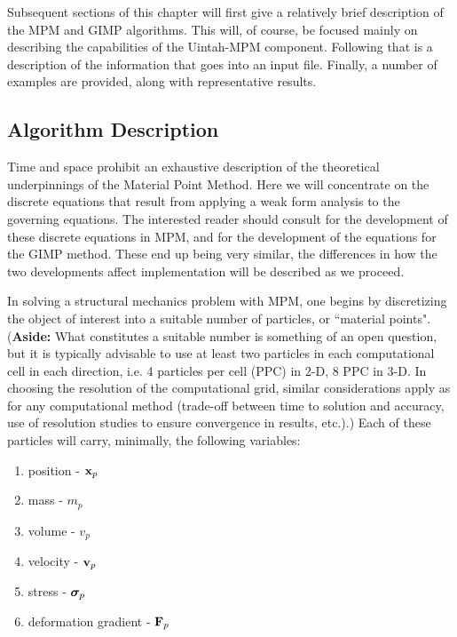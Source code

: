 Subsequent sections of this chapter will first give a relatively brief
description of the MPM and GIMP algorithms.  This will, of course, be
focused mainly on describing the capabilities of the Uintah-MPM component.
Following that is a description of the information that goes into an input
file.  Finally, a number of examples are provided, along with representative
results.

\subsection{Algorithm Description}

Time and space prohibit an exhaustive description of the theoretical
underpinnings of the Material Point Method.   Here we will concentrate
on the discrete equations that result from applying a weak form analysis
to the governing equations.  The interested reader should
consult \cite{sulskycmame,sulskycpc} for the development of these discrete
equations in MPM, and \cite{bardgimp} for the development of the equations
for the GIMP method.  These end up being very similar, the differences in
how the two developments affect implementation will be described as we
proceed.

In solving a structural mechanics problem with MPM, one begins by discretizing
the object of interest into a suitable number of particles, or ``material
points".  ({\bf Aside:}  What constitutes a suitable number is something of an open
question, but it is typically advisable to use at least two particles in each
computational cell in each direction, i.e. 4 particles per cell (PPC) in 2-D,
8 PPC in 3-D. In choosing the resolution of the computational grid, similar
considerations apply as for any computational method (trade-off between
time to solution and accuracy, use of resolution studies to ensure convergence
in results, etc.).)  Each of these particles will carry, minimally, the
following variables:
\begin{enumerate}

\item position - $\bfx_p$
\item mass - $m_p$
\item volume - $v_p$
\item velocity - $\bfv_p$
\item stress - $\sig_p$ 
\item deformation gradient - $\bfF_p$

\end{enumerate}

